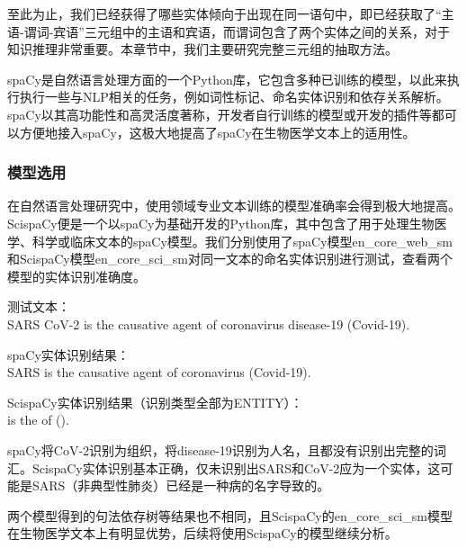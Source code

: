 \documentclass[twocolumn]{article}
\begin{document}
至此为止，我们已经获得了哪些实体倾向于出现在同一语句中，即已经获取了“主语-谓词-宾语”三元组中的主语和宾语，而谓词包含了两个实体之间的关系，对于知识推理非常重要。本章节中，我们主要研究完整三元组的抽取方法。\par
spaCy是自然语言处理方面的一个Python库，它包含多种已训练的模型，以此来执行执行一些与NLP相关的任务，例如词性标记、命名实体识别和依存关系解析。spaCy以其高功能性和高灵活度著称，开发者自行训练的模型或开发的插件等都可以方便地接入spaCy，这极大地提高了spaCy在生物医学文本上的适用性。\par

\subsubsection{模型选用}
在自然语言处理研究中，使用领域专业文本训练的模型准确率会得到极大地提高。ScispaCy便是一个以spaCy为基础开发的Python库，其中包含了用于处理生物医学、科学或临床文本的spaCy模型。我们分别使用了spaCy模型en\_core\_web\_sm和ScispaCy模型en\_core\_sci\_sm对同一文本的命名实体识别进行测试，查看两个模型的实体识别准确度。\par
测试文本：\\
SARS CoV-2 is the causative agent of coronavirus disease-19 (Covid-19).\par
spaCy实体识别结果：\\
SARS  is the causative agent of coronavirus  (Covid-19).\par
ScispaCy实体识别结果（识别类型全部为ENTITY）：\\
  is the  of   ().\par
spaCy将CoV-2识别为组织，将disease-19识别为人名，且都没有识别出完整的词汇。ScispaCy实体识别基本正确，仅未识别出SARS和CoV-2应为一个实体，这可能是SARS（非典型性肺炎）已经是一种病的名字导致的。\par
两个模型得到的句法依存树等结果也不相同，且ScispaCy的en\_core\_sci\_sm模型在生物医学文本上有明显优势，后续将使用ScispaCy的模型继续分析。\par
\end{document}
